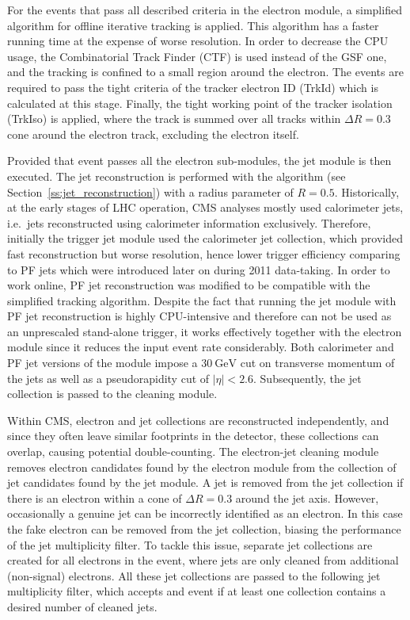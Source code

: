 For the events that pass all described criteria in the electron module, a simplified algorithm for offline iterative
tracking is applied. This algorithm has a faster running time at the expense of worse resolution. In order to decrease
the CPU usage, the Combinatorial Track Finder (CTF) \autocite{CTF_tracking} is used instead of the GSF one, and the
tracking is confined to a small region around the electron. The events are required to pass the tight criteria of the
tracker electron ID (TrkId) which is calculated at this stage. Finally, the tight working point of the tracker isolation
(TrkIso) is applied, where the track \pt is summed over all tracks within $\Delta R = 0.3$ cone around the electron
track, excluding the electron itself.

Provided that event passes all the electron sub-modules, the jet module is then executed. The jet reconstruction is
performed with the \antikt algorithm (see Section~\ref{ss:jet_reconstruction}) with a radius parameter of $R = 0.5$.
Historically, at the early stages of LHC operation, CMS analyses mostly used calorimeter jets, i.e.\ jets reconstructed
using calorimeter information exclusively. Therefore, initially the trigger jet module used the calorimeter jet
collection, which provided fast reconstruction but worse resolution, hence lower trigger efficiency comparing to PF jets
which were introduced later on during 2011 data-taking. In order to work online, PF jet reconstruction was modified to
be compatible with the simplified tracking algorithm. Despite the fact that running the jet module with PF jet
reconstruction is highly CPU-intensive and therefore can not be used as an unprescaled stand-alone trigger, it works
effectively together with the electron module since it reduces the input event rate considerably. Both calorimeter and
PF jet versions of the module impose a $\SI{30}{\GeV}$ cut on transverse momentum of the jets as well as a
pseudorapidity cut of $|\eta| < 2.6$. Subsequently, the jet collection is passed to the cleaning module.

Within CMS, electron and jet collections are reconstructed independently, and since they often leave similar footprints
in the detector, these collections can overlap, causing potential double-counting. The electron-jet cleaning module
removes electron candidates found by the electron module from the collection of jet candidates found by the jet module.
A jet is removed from the jet collection if there is an electron within a cone of $\Delta R = 0.3$ around the jet axis.
However, occasionally a genuine jet can be incorrectly identified as an electron. In this case the fake electron can be
removed from the jet collection, biasing the performance of the jet multiplicity filter. To tackle this issue, separate
jet collections are created for all electrons in the event, where jets are only cleaned from additional (non-signal)
electrons. All these jet collections are passed to the following jet multiplicity filter, which accepts and event if at
least one collection contains a desired number of cleaned jets.

